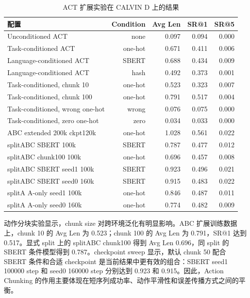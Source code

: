 \documentclass[UTF8,a4paper,11pt]{ctexart}
\begin{document}
\begin{table}[!htbp]
    \centering
    \caption{ACT 扩展实验在 CALVIN D 上的结果}
    \label{tab:act-extensions}
    \small
    \begin{tabularx}{\textwidth}{Xrrrr}
        \toprule
        配置 & Condition & Avg Len & SR@1 & SR@5 \\
        \midrule
        Unconditioned ACT & none & 0.097 & 0.094 & 0.000 \\
        Task-conditioned ACT & one-hot & 0.671 & 0.411 & 0.006 \\
        Language-conditioned ACT & SBERT & 0.688 & 0.434 & 0.009 \\
        Language-conditioned ACT & hash & 0.492 & 0.373 & 0.001 \\
        Task-conditioned, chunk 10 & one-hot & 0.523 & 0.323 & 0.007 \\
        Task-conditioned, chunk 100 & one-hot & 0.791 & 0.517 & 0.004 \\
        Task-conditioned, wrong one-hot & wrong & 0.076 & 0.075 & 0.000 \\
        Task-conditioned, zero one-hot & zero & 0.034 & 0.033 & 0.000 \\
        ABC extended 200k ckpt120k & one-hot & 1.028 & 0.561 & 0.022 \\
        splitABC SBERT 100k & SBERT & 0.787 & 0.477 & 0.012 \\
        splitABC chunk100 100k & one-hot & 0.696 & 0.457 & 0.008 \\
        splitABC SBERT seed1 100k & SBERT & 0.923 & 0.496 & 0.021 \\
        splitABC SBERT seed0 160k & SBERT & 0.915 & 0.483 & 0.022 \\
        splitA A-only seed1 100k & one-hot & 0.846 & 0.487 & 0.011 \\
        splitA A-only seed0 160k & one-hot & 0.774 & 0.482 & 0.009 \\
        \bottomrule
    \end{tabularx}
\end{table}

动作分块实验显示，chunk size 对跨环境泛化有明显影响。ABC 扩展训练数据上，chunk 10 的 Avg Len 为 0.523；chunk 100 的 Avg Len 为 0.791，SR@1 达到 0.517。显式 split 上的 splitABC chunk100 得到 Avg Len 0.696，同 split 的 SBERT 条件模型得到 0.787。checkpoint sweep 显示，默认 chunk 50 配合 SBERT 条件和合适 checkpoint 是当前结果中更有效的组合：SBERT seed1 100000 step 和 seed0 160000 step 分别达到 0.923 和 0.915。因此，Action Chunking 的作用主要体现在短序列成功率、动作平滑性和误差传播方式之间的平衡。
\end{document}
